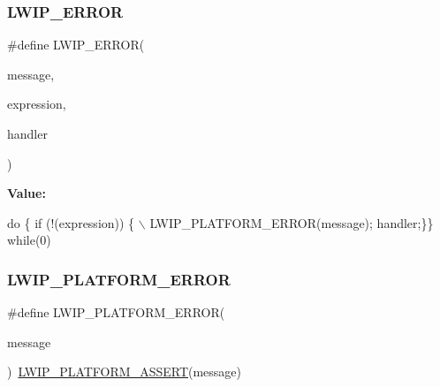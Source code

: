 \subsubsection{\texorpdfstring{L\+W\+I\+P\+\_\+\+E\+R\+R\+OR}{LWIP\_ERROR}}
{\footnotesize\ttfamily \#define L\+W\+I\+P\+\_\+\+E\+R\+R\+OR(\begin{DoxyParamCaption}\item[{}]{message,  }\item[{}]{expression,  }\item[{}]{handler }\end{DoxyParamCaption})}

{\bfseries Value\+:}
\begin{DoxyCode}
\textcolor{keywordflow}{do} \{ \textcolor{keywordflow}{if} (!(expression)) \{ \(\backslash\)
  LWIP\_PLATFORM\_ERROR(message); handler;\}\} \textcolor{keywordflow}{while}(0)
\end{DoxyCode}
\mbox{\label{openmote-cc2538_2lwip_2src_2include_2lwip_2debug_8h_a451cdce6343503ea686ff5e4eff37d3c}} 
\subsubsection{\texorpdfstring{L\+W\+I\+P\+\_\+\+P\+L\+A\+T\+F\+O\+R\+M\+\_\+\+E\+R\+R\+OR}{LWIP\_PLATFORM\_ERROR}}
{\footnotesize\ttfamily \#define L\+W\+I\+P\+\_\+\+P\+L\+A\+T\+F\+O\+R\+M\+\_\+\+E\+R\+R\+OR(\begin{DoxyParamCaption}\item[{}]{message }\end{DoxyParamCaption})~\hyperlink{group__compiler__abstraction_ga7e8bcd0282525704d6dd596bdd1b47d0}{L\+W\+I\+P\+\_\+\+P\+L\+A\+T\+F\+O\+R\+M\+\_\+\+A\+S\+S\+E\+RT}(message)}

